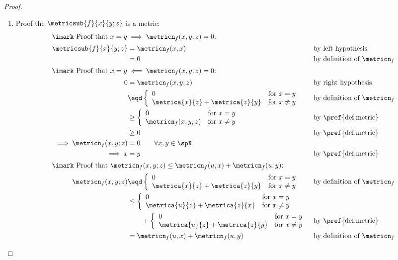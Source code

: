 \begin{proof}
\begin{enumerate}
  \item Proof the $\metricsub{f}{x}{y;z}$ is a metric:
    \begin{align*}
    \intertext{\imark Proof that $x=y\implies\metricn_f(x,y;z)=0$:}
      \metricsub{f}{x}{y;z}
        &= \metricn_f(x,x)
        && \text{by left hypothesis}
      \\&= 0
        && \text{by definition of $\metricn_f$}
      \\
    \intertext{\imark Proof that $x=y\impliedby\metricn_f(x,y;z)=0$:}
      0
        &=    \metricn_f(x,y;z)
        &&    \text{by right hypothesis}
      \\&\eqd \left\{\begin{array}{ll}
                0                 &\text{for } x=y \\
                \metrica{x}{z}+\metrica{z}{y} &\text{for } x\ne y
              \end{array} \right.
        &&    \text{by definition of $\metricn_f$}
      \\&\ge  \left\{\begin{array}{ll}
                0                 &\text{for } x=y \\
                \metricn_f(x,y;z)          &\text{for } x\ne y
              \end{array} \right.
        &&    \text{by \pref{def:metric}}
      \\&\ge  0
        &&    \text{by \pref{def:metric}}
      \\\implies \metricn_f(x,y;z) &= 0 \qquad \forall x,y\in\spX
      \\\implies x&=y
        && \text{by \pref{def:metric}}
      \\
    \intertext{\imark Proof that $\metricn_f(x,y;z)\le\metricn_f(u,x)+\metricn_f(u,y)$:}
      \metricn_f(x,y;z)
        &\eqd \left\{\begin{array}{ll}
                0                 &\text{for } x=y \\
                \metrica{x}{z}+\metrica{z}{y} &\text{for } x\ne y
              \end{array} \right.
        &&    \text{by definition of $\metricn_f$}
      \\&\le  \left\{\begin{array}{ll}
                0                 &\text{for } x=y \\
                \metrica{u}{z}+\metrica{z}{x} &\text{for } x\ne y
              \end{array} \right.
     \\&\qquad+    \left\{\begin{array}{ll}
                0                 &\text{for } x=y \\
                \metrica{u}{z}+\metrica{z}{y} &\text{for } x\ne y
              \end{array} \right.
        &&    \text{by \pref{def:metric}}
      \\&=    \metricn_f(u,x) + \metricn_f(u,y)
        &&    \text{by definition of $\metricn_f$}
    \end{align*}


\end{enumerate}
\end{proof}
